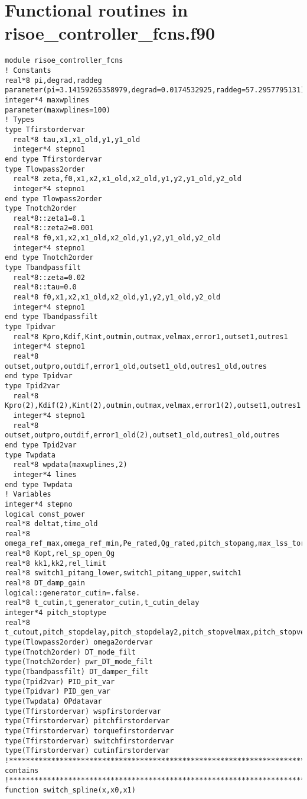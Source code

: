 \section{Functional routines in risoe\_controller\_fcns.f90}
{\scriptsize
\begin{verbatim}
module risoe_controller_fcns
! Constants
real*8 pi,degrad,raddeg
parameter(pi=3.14159265358979,degrad=0.0174532925,raddeg=57.2957795131)
integer*4 maxwplines
parameter(maxwplines=100)
! Types
type Tfirstordervar
  real*8 tau,x1,x1_old,y1,y1_old
  integer*4 stepno1
end type Tfirstordervar
type Tlowpass2order
  real*8 zeta,f0,x1,x2,x1_old,x2_old,y1,y2,y1_old,y2_old
  integer*4 stepno1
end type Tlowpass2order
type Tnotch2order
  real*8::zeta1=0.1
  real*8::zeta2=0.001
  real*8 f0,x1,x2,x1_old,x2_old,y1,y2,y1_old,y2_old
  integer*4 stepno1
end type Tnotch2order
type Tbandpassfilt
  real*8::zeta=0.02
  real*8::tau=0.0
  real*8 f0,x1,x2,x1_old,x2_old,y1,y2,y1_old,y2_old
  integer*4 stepno1
end type Tbandpassfilt
type Tpidvar
  real*8 Kpro,Kdif,Kint,outmin,outmax,velmax,error1,outset1,outres1
  integer*4 stepno1
  real*8 outset,outpro,outdif,error1_old,outset1_old,outres1_old,outres
end type Tpidvar
type Tpid2var
  real*8 Kpro(2),Kdif(2),Kint(2),outmin,outmax,velmax,error1(2),outset1,outres1
  integer*4 stepno1
  real*8 outset,outpro,outdif,error1_old(2),outset1_old,outres1_old,outres
end type Tpid2var
type Twpdata
  real*8 wpdata(maxwplines,2)
  integer*4 lines
end type Twpdata
! Variables
integer*4 stepno
logical const_power
real*8 deltat,time_old
real*8 omega_ref_max,omega_ref_min,Pe_rated,Qg_rated,pitch_stopang,max_lss_torque
real*8 Kopt,rel_sp_open_Qg
real*8 kk1,kk2,rel_limit
real*8 switch1_pitang_lower,switch1_pitang_upper,switch1
real*8 DT_damp_gain
logical::generator_cutin=.false.
real*8 t_cutin,t_generator_cutin,t_cutin_delay
integer*4 pitch_stoptype
real*8 t_cutout,pitch_stopdelay,pitch_stopdelay2,pitch_stopvelmax,pitch_stopvelmax2
type(Tlowpass2order) omega2ordervar
type(Tnotch2order) DT_mode_filt
type(Tnotch2order) pwr_DT_mode_filt
type(Tbandpassfilt) DT_damper_filt
type(Tpid2var) PID_pit_var
type(Tpidvar) PID_gen_var
type(Twpdata) OPdatavar
type(Tfirstordervar) wspfirstordervar
type(Tfirstordervar) pitchfirstordervar
type(Tfirstordervar) torquefirstordervar
type(Tfirstordervar) switchfirstordervar
type(Tfirstordervar) cutinfirstordervar
!**************************************************************************************************
contains
!**************************************************************************************************
function switch_spline(x,x0,x1)

\end{verbatim}}
